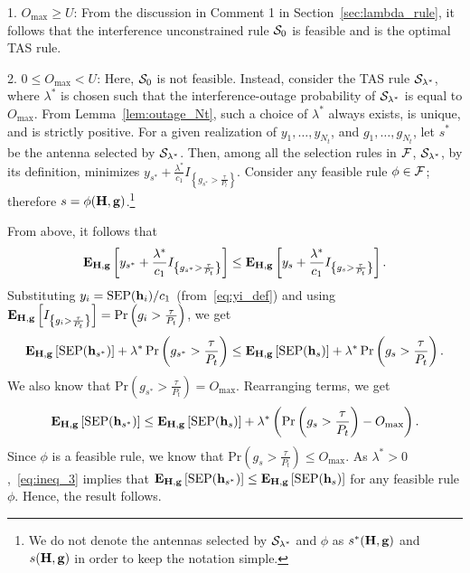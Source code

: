 \documentclass[12pt,draftcls,peerreview,onecolumn]{IEEEtran}
\newcommand{\brac}[1]{\left({#1}\right)}
\newcommand{\cbrac}[1]{\left\{{#1}\right\}}
\newcommand{\indic}[1]{I_{\cbrac{#1}}}
\newcommand{\mtx}[1]{{\bf #1}} %
\newcommand{\explow}[2]{{\bf{E}}_{#1}\left[{#2}\right]}
\newcommand{\prob}[1]{\text{Pr}\brac{#1}}
\newcommand{\SEP}{\text{SEP}}
\newcommand{\lam}{\lambda}
\newcommand{\lamstar}{\lam^{*}}
\newcommand{\sstar}{s^{*}}
\newcommand{\F}{\cal{F}}
\newcommand{\Nt}{{N_t}}
\newcommand{\Pt}{{P_t}}
\newcommand{\puch}{g}
\newcommand{\gk}[1]{{\puch_{#1}}}
\newcommand{\g}{\mathbf{\puch}}
\newcommand{\outmax}{O_{\text{max}}}
\newcommand{\itau}{\tau}
\newcommand{\cone}{c_{1}}
\newcommand{\taubypt}{\frac{\itau}{\Pt}}
\newcommand{\gkgrtaubypt}[1]{{\gk{#1}}>\taubypt}
\newcommand{\gindic}[1]{\indic{\gkgrtaubypt{#1}}}
\newcommand{\yk}[1]{y_{#1}}
\newcommand{\un}{U}
\newcommand{\asrule}{\phi}
\newcommand{\Hmx}{\mtx{H}}
\newcommand{\caluncons}{{\cal S_{\text{0}}}}
\newcommand{\callamstarrule}{\cal S_{\lam^{*}}}
\begin{document}
{ 1. $\outmax\geq\un$:} From the discussion in Comment 1 in Section~\ref{sec:lambda_rule}, it follows that the interference unconstrained rule $\caluncons$ is feasible and is the optimal TAS rule. 

{2. $0\leq\outmax<\un$:} Here, $\caluncons$ is not feasible.  Instead, consider the TAS rule $\callamstarrule$, where $\lamstar$ is chosen such that the interference-outage probability of $\callamstarrule$ is equal to $\outmax$. From Lemma~\ref{lem:outage_Nt}, such a choice of $\lamstar$ always exists, is unique, and is strictly positive. For a given realization of $\yk{1},\ldots,\yk{\Nt}$, and $\gk{1},\ldots,\gk{\Nt}$, let $\sstar$ be the antenna selected by $\callamstarrule$. Then, among all the selection rules in $\F$, $\callamstarrule$, by its definition,  minimizes $\yk{{\sstar}} + \frac{\lamstar}{\cone}\gindic{{\sstar}}$. Consider any feasible rule $\asrule\in\F$; therefore  $s=\phi(\Hmx,\g)$.\footnote{We do not denote the antennas selected by $\callamstarrule$ and $\phi$ as $s^*(\Hmx,\g)$ and $s(\Hmx,\g)$ in order to keep the notation simple.} 

From above, it follows that   
\begin{equation}
\label{eq:opt_rul_1}  
   \explow{\Hmx,\g}{\yk{{\sstar}} + \frac{\lamstar}{\cone}\gindic{{\sstar}}} \leq  \explow{\Hmx,\g}{\yk{{s}} + \frac{\lamstar}{\cone}\gindic{{s}}}.
\end{equation}
%
Substituting $\yk{i}={\SEP(\bhk{i})}/{\cone}$ (from~\eqref{eq:yi_def}) and using $\explow{\Hmx,\g}{\gindic{i}}=\prob{\gk{i}>\taubypt}$, we get
%
\begin{equation}
\label{eq:opt_rul_2}
   \explow{\Hmx,\g}{\SEP(\hsstar)} + \lamstar \, \prob{\gk{\sstar}>\taubypt} \leq  \explow{\Hmx,\g}{\SEP(\hs)} + \lamstar \, \prob{\gk{s}>\taubypt}.
\end{equation}
%
We also know that $\prob{\gk{\sstar}>\taubypt}=\outmax$. Rearranging terms, we get
%
\begin{equation}
\label{eq:ineq_3}
\explow{\Hmx,\g}{\SEP(\hsstar)} \leq \explow{\Hmx,\g}{\SEP(\hs)} + \lamstar \left( \prob{\gk{s}>\taubypt} -  \outmax \right).
\end{equation}
%
Since $\phi$ is a feasible rule, we know that $\prob{\gkgrtaubypt{s}}\leq \outmax$. As $\lamstar>0$,~\eqref{eq:ineq_3} implies that $\explow{\Hmx,\g}{\SEP(\hsstar)} \leq \explow{\Hmx,\g}{\SEP(\hs)}$ for any feasible rule $\phi$. Hence, the result follows. %
\end{document}

